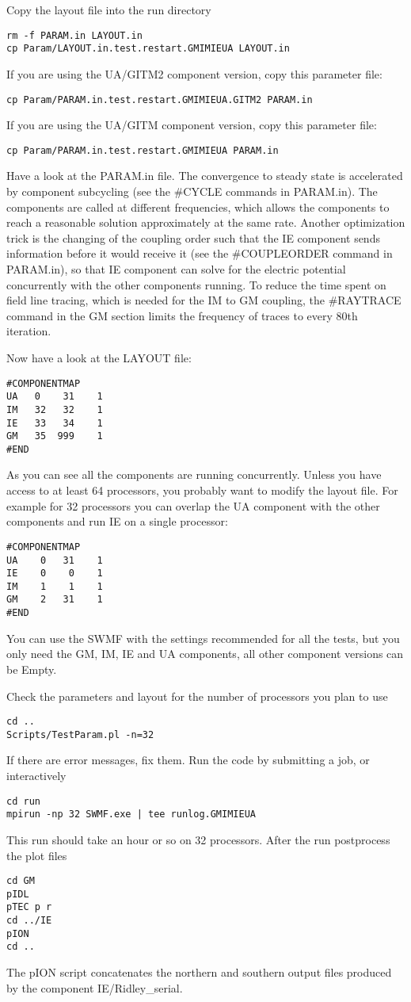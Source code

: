 Copy the layout file into the run directory
\begin{verbatim}
rm -f PARAM.in LAYOUT.in
cp Param/LAYOUT.in.test.restart.GMIMIEUA LAYOUT.in
\end{verbatim}
If you are using the UA/GITM2 component version, copy this parameter file:
\begin{verbatim}
cp Param/PARAM.in.test.restart.GMIMIEUA.GITM2 PARAM.in
\end{verbatim}
If you are using the UA/GITM component version, copy this parameter file:
\begin{verbatim}
cp Param/PARAM.in.test.restart.GMIMIEUA PARAM.in
\end{verbatim}
Have a look at the PARAM.in file.
The convergence to steady state is accelerated by component subcycling
(see the \#CYCLE commands in PARAM.in).
The components are called at different frequencies, which
allows the components to reach a reasonable solution
approximately at the same rate. Another optimization trick is the changing of 
the coupling order such that the IE component sends information before
it would receive it (see the \#COUPLEORDER command in PARAM.in),
so that IE component can solve for the electric potential concurrently with the
other components running. To reduce the time spent on field line
tracing, which is needed for the IM to GM coupling, the \#RAYTRACE command
in the GM section limits the frequency of traces to every 80th iteration.

Now have a look at the LAYOUT file:
\begin{verbatim}
#COMPONENTMAP
UA   0    31    1
IM   32   32    1
IE   33   34    1
GM   35  999    1
#END
\end{verbatim}
As you can see all the components are running concurrently.
Unless you have access to at least 64 processors, 
you probably want to modify the layout file.
For example for 32 processors you can overlap the UA component 
with the other components and run IE on a single processor:
\begin{verbatim}
#COMPONENTMAP
UA    0   31    1
IE    0    0    1
IM    1    1    1
GM    2   31    1
#END
\end{verbatim}
You can use the SWMF with the settings recommended for all the tests, 
but you only need the GM, IM, IE and UA components,
all other component versions can be Empty.

Check the parameters and layout for the number of processors you plan to use
\begin{verbatim}
cd ..
Scripts/TestParam.pl -n=32
\end{verbatim}
If there are error messages, fix them. 
Run the code by submitting a job, or interactively
\begin{verbatim}
cd run
mpirun -np 32 SWMF.exe | tee runlog.GMIMIEUA
\end{verbatim}
This run should take an hour or so on 32 processors.
After the run postprocess the plot files
\begin{verbatim}
cd GM
pIDL
pTEC p r
cd ../IE
pION
cd ..
\end{verbatim}
The pION script concatenates the northern and southern output files
produced by the component IE/Ridley\_serial.

